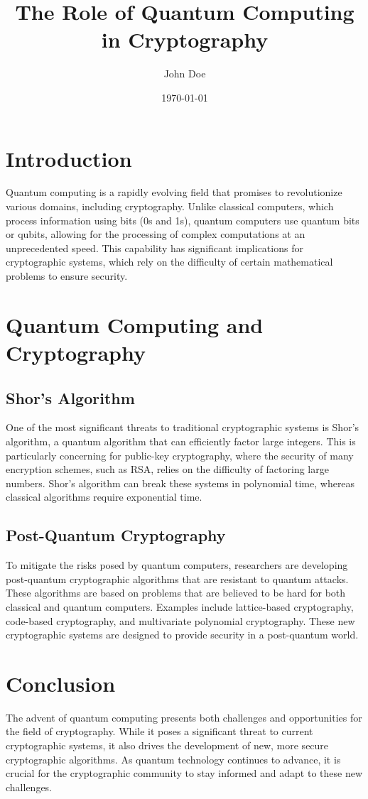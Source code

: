 \documentclass[12pt]{article}
\title{The Role of Quantum Computing in Cryptography}
\author{John Doe}
\date{\today}
\begin{document}
\maketitle
\section{Introduction}
Quantum computing is a rapidly evolving field that promises to revolutionize various domains, including cryptography. Unlike classical computers, which process information using bits (0s and 1s), quantum computers use quantum bits or qubits, allowing for the processing of complex computations at an unprecedented speed. This capability has significant implications for cryptographic systems, which rely on the difficulty of certain mathematical problems to ensure security.

\section{Quantum Computing and Cryptography}
\subsection{Shor's Algorithm}
One of the most significant threats to traditional cryptographic systems is Shor's algorithm, a quantum algorithm that can efficiently factor large integers. This is particularly concerning for public-key cryptography, where the security of many encryption schemes, such as RSA, relies on the difficulty of factoring large numbers. Shor's algorithm can break these systems in polynomial time, whereas classical algorithms require exponential time.

\subsection{Post-Quantum Cryptography}
To mitigate the risks posed by quantum computers, researchers are developing post-quantum cryptographic algorithms that are resistant to quantum attacks. These algorithms are based on problems that are believed to be hard for both classical and quantum computers. Examples include lattice-based cryptography, code-based cryptography, and multivariate polynomial cryptography. These new cryptographic systems are designed to provide security in a post-quantum world.

\section{Conclusion}
The advent of quantum computing presents both challenges and opportunities for the field of cryptography. While it poses a significant threat to current cryptographic systems, it also drives the development of new, more secure cryptographic algorithms. As quantum technology continues to advance, it is crucial for the cryptographic community to stay informed and adapt to these new challenges.
\end{document}
